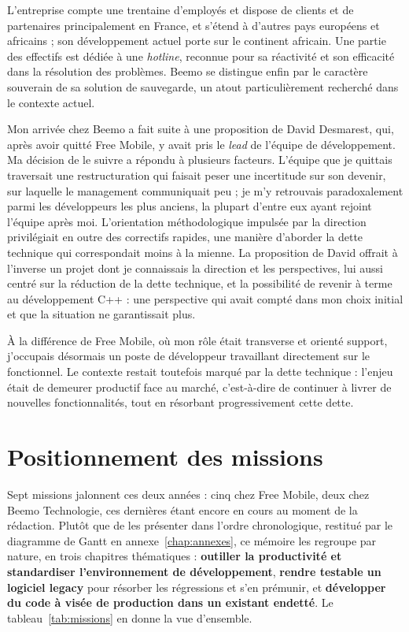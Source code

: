 L'entreprise compte une trentaine d'employés et dispose de clients et de
partenaires principalement en France, et s'étend à d'autres pays européens et
africains ; son développement actuel porte sur le continent africain. Une partie des effectifs est dédiée à une \emph{hotline},
reconnue pour sa réactivité et son efficacité dans la résolution des
problèmes. Beemo se distingue enfin par le caractère souverain de sa solution
de sauvegarde, un atout particulièrement recherché dans le contexte actuel.

Mon arrivée chez Beemo a fait suite à une proposition de David Desmarest, qui,
après avoir quitté Free Mobile, y avait pris le \emph{lead} de l'équipe de
développement. Ma décision de le
suivre a répondu à plusieurs facteurs. L'équipe que je quittais traversait une
restructuration qui faisait peser une incertitude sur son devenir, sur laquelle
le management communiquait peu ; je m'y retrouvais paradoxalement parmi les
développeurs les plus anciens, la plupart d'entre eux ayant rejoint l'équipe
après moi. L'orientation méthodologique impulsée par la direction privilégiait
en outre des correctifs rapides, une manière d'aborder la dette technique qui
correspondait moins à la mienne. La proposition de David offrait à l'inverse un
projet dont je connaissais la direction et les perspectives, lui aussi centré
sur la réduction de la dette technique, et la possibilité de revenir à terme au
développement C++ : une perspective qui avait compté dans mon choix initial et
que la situation ne garantissait plus.

À la différence de Free Mobile, où mon rôle était transverse et orienté support,
j'occupais désormais un poste de développeur travaillant directement sur le
fonctionnel. Le contexte restait toutefois marqué par la dette technique :
l'enjeu était de demeurer productif face au marché, c'est-à-dire de
continuer à livrer de nouvelles fonctionnalités, tout en résorbant
progressivement cette dette.

\section{Positionnement des missions}
Sept missions jalonnent ces deux années : cinq chez Free Mobile, deux chez
Beemo Technologie, ces dernières étant encore en cours au moment de la
rédaction. Plutôt que de les présenter dans l'ordre chronologique, restitué
par le diagramme de Gantt en annexe~\ref{chap:annexes}, ce mémoire les
regroupe par nature, en trois chapitres thématiques : \textbf{outiller la productivité et
standardiser l'environnement de développement}, \textbf{rendre testable un
logiciel legacy} pour résorber les régressions et s'en prémunir, et
\textbf{développer du code à visée de production dans un existant endetté}.
Le tableau~\ref{tab:missions} en donne la vue d'ensemble.

